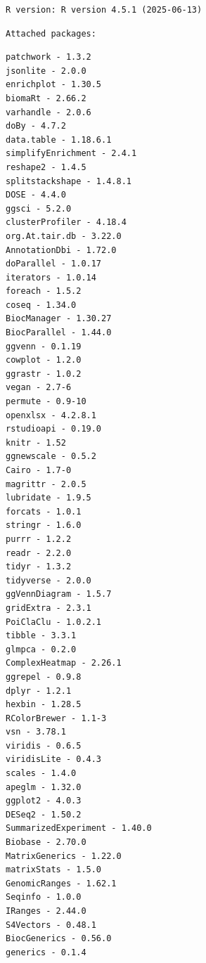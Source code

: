 \documentclass[
  11pt,
]{article}
\begin{document}
\begin{verbatim}
R version: R version 4.5.1 (2025-06-13) 
\end{verbatim}

\begin{verbatim}
Attached packages:
\end{verbatim}

\begin{verbatim}
patchwork - 1.3.2 
jsonlite - 2.0.0 
enrichplot - 1.30.5 
biomaRt - 2.66.2 
varhandle - 2.0.6 
doBy - 4.7.2 
data.table - 1.18.6.1 
simplifyEnrichment - 2.4.1 
reshape2 - 1.4.5 
splitstackshape - 1.4.8.1 
DOSE - 4.4.0 
ggsci - 5.2.0 
clusterProfiler - 4.18.4 
org.At.tair.db - 3.22.0 
AnnotationDbi - 1.72.0 
doParallel - 1.0.17 
iterators - 1.0.14 
foreach - 1.5.2 
coseq - 1.34.0 
BiocManager - 1.30.27 
BiocParallel - 1.44.0 
ggvenn - 0.1.19 
cowplot - 1.2.0 
ggrastr - 1.0.2 
vegan - 2.7-6 
permute - 0.9-10 
openxlsx - 4.2.8.1 
rstudioapi - 0.19.0 
knitr - 1.52 
ggnewscale - 0.5.2 
Cairo - 1.7-0 
magrittr - 2.0.5 
lubridate - 1.9.5 
forcats - 1.0.1 
stringr - 1.6.0 
purrr - 1.2.2 
readr - 2.2.0 
tidyr - 1.3.2 
tidyverse - 2.0.0 
ggVennDiagram - 1.5.7 
gridExtra - 2.3.1 
PoiClaClu - 1.0.2.1 
tibble - 3.3.1 
glmpca - 0.2.0 
ComplexHeatmap - 2.26.1 
ggrepel - 0.9.8 
dplyr - 1.2.1 
hexbin - 1.28.5 
RColorBrewer - 1.1-3 
vsn - 3.78.1 
viridis - 0.6.5 
viridisLite - 0.4.3 
scales - 1.4.0 
apeglm - 1.32.0 
ggplot2 - 4.0.3 
DESeq2 - 1.50.2 
SummarizedExperiment - 1.40.0 
Biobase - 2.70.0 
MatrixGenerics - 1.22.0 
matrixStats - 1.5.0 
GenomicRanges - 1.62.1 
Seqinfo - 1.0.0 
IRanges - 2.44.0 
S4Vectors - 0.48.1 
BiocGenerics - 0.56.0 
generics - 0.1.4 
\end{verbatim}
\end{document}
